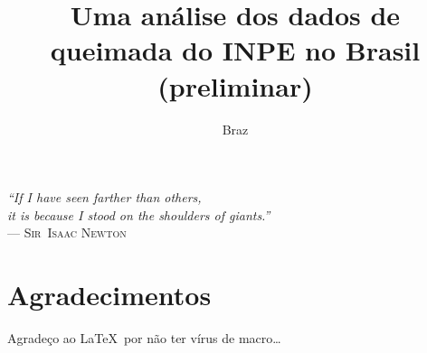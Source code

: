 \documentclass[cic,tc]{iiufrgs}
\title{Uma análise dos dados de queimada do INPE no Brasil (preliminar)}
\author{Braz}{José Henrique da Silva}
\begin{document}
\maketitle

\clearpage
\begin{flushright}
\mbox{}\vfill
{\sffamily\itshape
``If I have seen farther than others,\\
it is because I stood on the shoulders of giants.''\\}
--- \textsc{Sir~Isaac Newton}
\end{flushright}

\chapter*{Agradecimentos}
Agradeço ao \LaTeX\ por não ter vírus de macro\ldots

\tableofcontents
\end{document}
